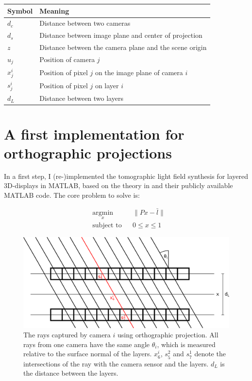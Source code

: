 \documentclass[11pt,a4paper,titlepage]{article}
\begin{document}
\begin{center}
	\begin{tabular}{|l|l|}
	
		\hline
		Symbol 	& Meaning \\
		\hline 
		$d_c$ 	& Distance between two cameras \\ 
		\hline 
		$d_s$ 	& Distance between image plane and center of projection \\ 
		\hline 
		$z$ 	& Distance between the camera plane and the scene origin \\ 
		\hline
		$u_j$	& Position of camera $j$ \\
		\hline
		$x_j^i$ & Position of pixel $j$ on the image plane of camera $i$ \\
		\hline
		$s_j^i$ & Position of pixel $j$ on layer $i$ \\ 
		\hline 
		$d_L$ 	& Distance between two layers \\ 
		\hline 

	\end{tabular} 
\end{center}

\section{A first implementation for orthographic projections}	\label{sec:first_implementation}
In a first step, I (re-)implemented the tomographic light field synthesis for layered 3D-displays in MATLAB, based on the theory in \cite{WETZ_TOMO} and their publicly available MATLAB code. The core problem to solve is:

\begin{equation} \label{eq:core_problem}
	\begin{aligned}
		& \underset{x}{\text{argmin}} & & \| Px - \bar{l} \| \\
		& \text{subject to} & & 0 \leq x \leq 1
	\end{aligned}
\end{equation}

\begin{figure}[h]
	\centering
	\includegraphics[scale=0.6]{sketches/layers_orthographic_rays.png} 
	\caption{The rays captured by camera $i$ using orthographic projection. All rays from one camera have the same angle $\theta_i$, which is measured relative to the surface normal of the layers. $x_6^i$, $s_5^2$ and $s_7^1$ denote the intersections of the ray with the camera sensor and the layers. $d_L$ is the distance between the layers.}
	\label{fig:orthographic_cameras_layers_sketch}
\end{figure}
\end{document}
